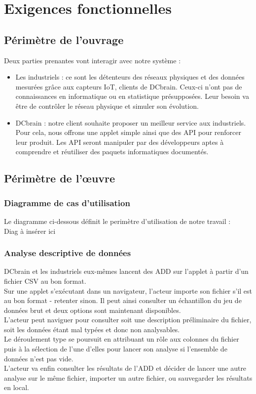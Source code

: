 	\section{Exigences fonctionnelles}
	
		\subsection{Périmètre de l'ouvrage}
			Deux parties prenantes vont interagir avec notre système :
			\begin{itemize}
			\item Les industriels : ce sont les détenteurs des réseaux physiques et des données mesurées grâce aux capteurs IoT, clients de DCbrain. Ceux-ci n'ont pas de connaissances en informatique ou en statistique présupposées. Leur besoin va être de contrôler le réseau physique et simuler son évolution.
			\item DCbrain : notre client souhaite proposer un meilleur service aux industriels. Pour cela, nous offrons une applet simple ainsi que des API pour renforcer leur produit. Les API seront manipuler par des développeurs aptes à comprendre et réutiliser des paquets informatiques documentés.
			\end{itemize}
				
		\subsection{Périmètre de l'œuvre}
		
			\subsubsection{Diagramme de cas d'utilisation}
				Le diagramme ci-dessous définit le perimètre d'utilisation de notre travail :\\
					{\color{red} Diag à insérer ici}
				
			\subsubsection{Analyse descriptive de données}
				DCbrain et les industriels eux-mêmes lancent des ADD sur l'applet à partir d'un fichier CSV au bon format.\\
				Sur une applet s'exécutant dans un navigateur, l'acteur importe son fichier s'il est au bon format - retenter sinon. Il peut ainsi consulter un échantillon du jeu de données brut et deux options sont maintenant disponibles.\\
				L'acteur peut naviguer pour consulter soit une description préliminaire du fichier, soit les données étant mal typées et donc non analysables.\\
				Le déroulement type se poursuit en attribuant un rôle aux colonnes du fichier puis à la sélection de l'une d'elles pour lancer son analyse si l'ensemble de données n'est pas vide.\\
				L'acteur va enfin consulter les résultats de l'ADD et décider de lancer une autre analyse sur le même fichier, importer un autre fichier, ou sauvegarder les résultats en local.
				
